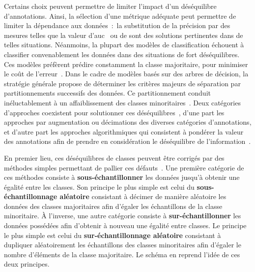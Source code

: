 Certains choix peuvent permettre de limiter l'impact d'un déséquilibre d'annotations. Ainsi, la sélection d'une métrique adéquate peut permettre de limiter la dépendance aux données~:~la substitution de la précision par des mesures telles que la valeur d'\gls{auc}~\cite{Celebi2007} ou de \fscore{} sont des solutions pertinentes dans de telles situations. Néanmoins, la plupart des modèles de classification échouent à classifier convenablement les données dans des situations de fort déséquilibres. Ces modèles préfèrent prédire constamment la classe majoritaire, pour minimiser le coût de l'erreur~\cite{Huang2013}. Dans le cadre de modèles basés sur des arbres de décision, la stratégie générale propose de déterminer les critères majeurs de séparation par partitionnements successifs des données. Ce partitionnement conduit inéluctablement à un affaiblissement des classes minoritaires~\cite{HaiboHe2009}. Deux catégories d'approches coexistent pour solutionner ces déséquilibres~\cite{Huang2013}, d'une part les approches par augmentation ou décimations des diverses catégories d'annotations, et d'autre part les approches algorithmiques qui consistent à pondérer la valeur des annotations afin de prendre en considération le déséquilibre de l'information~\cite{Ting2002,HaiboHe2009,ThaiNghe2010}.\par

En premier lieu, ces déséquilibres de classes peuvent être corrigés par des méthodes simples permettant de pallier ces défauts~\cite{Prati2009, HaiboHe2009}. Une première catégorie de ces méthodes consiste à \textbf{sous-échantillonner} les données jusqu'à obtenir une égalité entre les classes. Son principe le plus simple est celui du \textbf{sous-échantillonnage aléatoire} consistant à décimer de manière aléatoire les données des classes majoritaires afin d'égaler les échantillons de la classe minoritaire. À l'inverse, une autre catégorie consiste à \textbf{sur-échantillonner} les données possédées afin d'obtenir à nouveau une égalité entre classes. Le principe le plus simple est celui du \textbf{sur-échantillonnage aléatoire} consistant à dupliquer aléatoirement les échantillons des classes minoritaires afin d'égaler le nombre d'éléments de la classe majoritaire. Le schéma en  reprend l'idée de ces deux principes.\par

